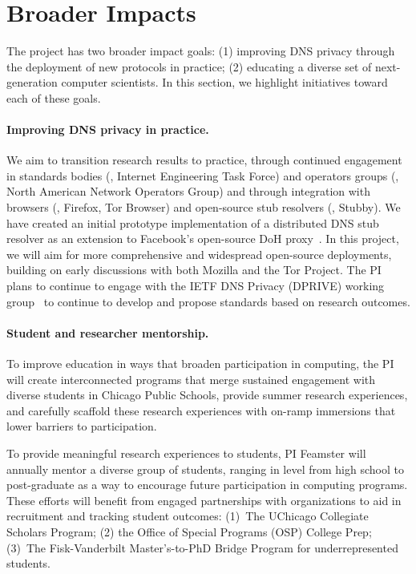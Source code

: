 \section{Broader Impacts}\label{sec:impacts}

The project has two broader impact goals: (1) improving DNS privacy through
the deployment of new protocols in practice; (2) educating a diverse set of
next-generation computer scientists. In this section, we highlight 
initiatives toward each of these goals.

\paragraph{Improving DNS privacy in practice.}
We aim to transition research results to practice, through
continued engagement in standards bodies (\eg, Internet Engineering Task
Force) and operators groups (\eg, North American Network Operators Group) and
through 
integration with browsers (\eg, Firefox, Tor
Browser) and open-source stub resolvers (\eg, Stubby). We have created an
initial prototype implementation of a distributed DNS stub resolver as an
extension to Facebook's open-source DoH proxy~\cite{fb-doh-proxy}. In this
project, we will aim for more comprehensive and widespread open-source
deployments, building on early discussions with both Mozilla and the Tor
Project. The PI plans to continue to engage with the IETF DNS Privacy
(DPRIVE) working group~\cite{dprive} to continue to develop and propose standards based on
research outcomes.

\paragraph{Student and researcher mentorship.} To improve education in ways
that broaden participation in computing, the PI will create interconnected
programs that merge sustained engagement with diverse students in Chicago
Public Schools, provide summer research experiences, and carefully scaffold
these research experiences with on-ramp immersions that lower barriers to
participation.  

To provide meaningful research experiences to students, PI Feamster will
annually mentor a diverse group of students, ranging in level from high school
to post-graduate as a way to encourage future participation in computing
programs. These efforts will benefit from engaged partnerships with
organizations to aid in recruitment and tracking student outcomes: (1)~The
UChicago Collegiate Scholars Program; (2) the Office of Special Programs (OSP)
College Prep; (3)~The Fisk-Vanderbilt Master's-to-PhD Bridge Program for
underrepresented students.

